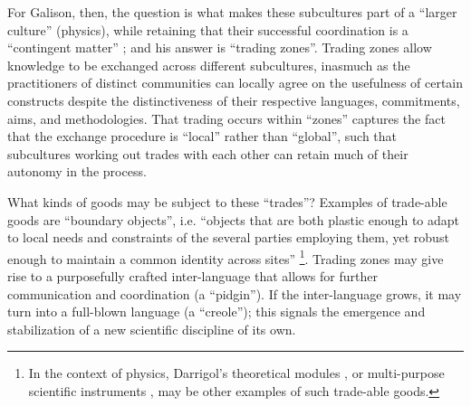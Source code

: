 \documentclass[smallextended]{svjour3}
\begin{document}
For Galison, then, the question is what makes these subcultures part of a ``larger culture'' (physics), %
while retaining that their successful coordination is a ``contingent matter'' \citep[p.~18]{galison1997image}; and his answer is ``trading zones''. Trading zones allow knowledge to be exchanged across different subcultures, inasmuch as the practitioners of distinct communities can locally agree on the usefulness of certain constructs despite the distinctiveness of their respective languages, commitments, aims, and methodologies. That trading occurs within ``zones'' captures the fact that the exchange procedure is  ``local'' rather than ``global'', such that subcultures working out trades with each other can retain much of their autonomy in the process.%

What kinds of goods may be subject to these ``trades''? Examples of trade-able goods are ``boundary objects'', i.e. ``objects that are both plastic enough to adapt to local needs and constraints of the several parties employing them, yet robust enough to maintain a common identity across sites'' \citep[p.~393]{Star1989}\footnote{In the context of physics, Darrigol's theoretical modules \citep[p.~214]{Darrigol2007}, or multi-purpose scientific instruments \citep[pp.~179--182]{Shinn2005}, may be other examples of such trade-able goods.}. Trading zones may give rise to a purposefully crafted inter-language that allows for further communication and coordination (a ``pidgin''). If the inter-language grows, it may turn into a full-blown language (a ``creole''); this signals the emergence and stabilization of a new scientific discipline of its own. 
\end{document}
